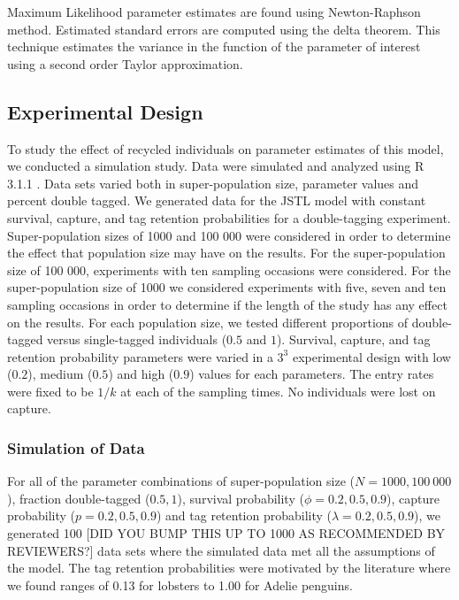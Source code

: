 \documentclass[]{article}
\begin{document}
Maximum Likelihood parameter estimates are found using Newton-Raphson
method. Estimated standard errors are computed using the delta theorem.
This technique estimates the variance in the function of the parameter
of interest using a second order Taylor approximation.

\subsection{Experimental Design}\label{experimental-design}

To study the effect of recycled individuals on parameter estimates of
this model, we conducted a simulation study. Data were simulated and
analyzed using R 3.1.1 \citep{R}. Data sets varied both in super-population size,
parameter values and percent double tagged. We generated data for the
JSTL model with constant survival, capture, and tag retention
probabilities for a double-tagging experiment. Super-population sizes of
1000 and 100 000 were considered in order to determine the effect that
population size may have on the results. For the super-population size
of 100 000, experiments with ten sampling occasions were considered. For
the super-population size of 1000 we considered experiments with five,
seven and ten sampling occasions in order to determine if the length of
the study has any effect on the results. For each population size, we
tested different proportions of double-tagged versus single-tagged
individuals (\(0.5\) and \(1\)). Survival, capture, and tag retention
probability parameters were varied in a \(3^3\) experimental design with
low (\(0.2\)), medium (\(0.5\)) and high (\(0.9\)) values for each
parameters. The entry rates were fixed to be $1/k$ at each of the
sampling times. No individuals were lost on capture.

\subsubsection{Simulation of Data}\label{simulation-of-data}

For all of the parameter combinations of super-population size
(\(N=1 000, 100 \ 000\)), fraction double-tagged (\(0.5, 1\)), survival
probability (\(\phi=0.2,0.5,0.9\)), capture probability
(\(p=0.2,0.5,0.9\)) and tag retention probability
(\(\lambda=0.2,0.5,0.9\)), we generated 100 [DID YOU BUMP THIS UP TO 1000 AS RECOMMENDED BY REVIEWERS?] data sets where the
simulated data met all the assumptions of the model. The tag retention probabilities were motivated by the literature where we found ranges of 0.13 \citep{Fogarty:1980} for lobsters to 1.00 \citep{Ainley:1980} for Adelie penguins.
\end{document}
